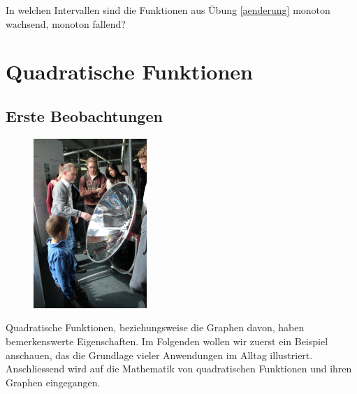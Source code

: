 \documentclass[%
11pt,%
twoside,%
titlepage,%
german,%
headsepline%
]{scrartcl}
\begin{document}
\begin{ueb}
In welchen Intervallen sind die Funktionen aus \"Ubung \ref{aenderung} monoton wachsend, monoton fallend?
\end{ueb}

\cleardoublepage

\section{Quadratische Funktionen}

\subsection{Erste Beobachtungen}

\begin{figure}
  \begin{center}
    \includegraphics[width=0.382\textwidth]{pictures/parabol}
  \end{center}
\end{figure}
Quadratische Funktionen, beziehungsweise die Graphen davon, haben bemerkenswerte Eigenschaften. Im Folgenden wollen wir zuerst ein Beispiel anschauen, das die Grundlage vieler Anwendungen im Alltag illustriert. Anschliessend wird auf die Mathematik von quadratischen Funktionen und ihren Graphen eingegangen.
\end{document}
